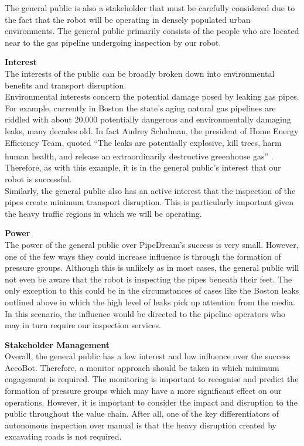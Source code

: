 \documentclass[11pt]{article}		%
\newcommand{\supercite}[1]{\textsuperscript{\cite{#1}}}		%
\begin{document}
			The general public is also a stakeholder that must be carefully considered due to the fact that the robot will be operating in densely populated urban environments. The general public primarily consists of the people who are located near to the gas pipeline undergoing inspection by our robot.
			
			\textbf{Interest}
			\\
	        The interests of the public can be broadly broken down into environmental benefits and transport disruption.
	        \\
		    \hspace*{3ex}Environmental interests concern the potential damage posed by leaking gas pipes. For example, currently in Boston the state’s aging natural gas pipelines are riddled with about 20,000 potentially dangerous and environmentally damaging leaks, many decades old. In fact Audrey Schulman, the president of Home Energy Efficiency Team, quoted  “The leaks are potentially explosive, kill trees, harm human health, and release an extraordinarily destructive greenhouse gas” \supercite{leaks}. Therefore, as with this example, it is in the general public's interest that our robot is successful.
		    \\
	        \hspace*{3ex}Similarly, the general public also has an active interest that the inspection of the pipes create minimum transport disruption. This is particularly important given the heavy traffic regions in which we will be operating. 
	        
	        \textbf{Power}
	        \\
	        The power of the general public over PipeDream's success is very small. However, one of the few ways they could increase influence is through the formation of pressure groups. Although this is unlikely as in most cases, the general public will not even be aware that the robot is inspecting the pipes beneath their feet. The only exception to this could be in the circumstances of cases like the Boston leaks outlined above in which the high level of leaks pick up attention from the media. In this scenario, the influence would be directed to the pipeline operators who may in turn require our inspection services.
	        
	        \textbf{Stakeholder Management}
	        \\
	        Overall, the general public has a low interest and low influence over the success AccoBot. Therefore, a monitor approach should be taken in which minimum engagement is required. The monitoring is important to recognise and predict the formation of pressure groups which may have a more significant effect on our operations. However, it is important to consider the impact and disruption to the public throughout the value chain. After all, one of the key differentiators of autonomous inspection over manual is that the heavy disruption created by excavating roads is not required.
        	
\end{document}
